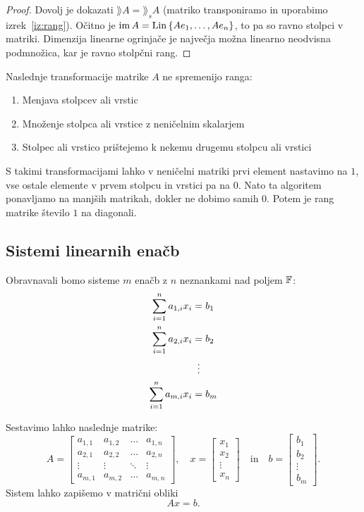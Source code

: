 \documentclass[12pt, a4paper]{article}
\begin{document}
\begin{proof}
Dovolj je dokazati $\rang A=\rang_s A$ (matriko transponiramo in uporabimo izrek~\ref{iz:rang}). Očitno je $\operatorname{im} A=\operatorname{Lin}\left\{Ae_1,\dots,Ae_n\right\}$, to pa so ravno stolpci v matriki. Dimenzija linearne ogrinjače je največja možna linearno neodvisna podmnožica, kar je ravno stolpčni rang.
\end{proof}

Naslednje transformacije matrike $A$ ne spremenijo ranga:

\begin{enumerate}[label=\roman*)]
\item Menjava stolpcev ali vrstic
\item Množenje stolpca ali vrstice z neničelnim skalarjem
\item Stolpec ali vrstico prištejemo k nekemu drugemu stolpcu ali vrstici
\end{enumerate}

S takimi transformacijami lahko v neničelni matriki prvi element nastavimo na $1$, vse ostale elemente v prvem stolpcu in vrstici pa na $0$. Nato ta algoritem ponavljamo na manjših matrikah, dokler ne dobimo samih $0$. Potem je rang matrike število $1$ na diagonali.

\newpage

\subsection{Sistemi linearnih enačb}

Obravnavali bomo sisteme $m$ enačb z $n$ neznankami nad poljem $\mathbb{F}$:
\begin{align*}
\sum_{i=1}^n a_{1,i}x_i&=b_1
\\
\sum_{i=1}^n a_{2,i}x_i&=b_2
\\
&\vdotswithin{=}
\\
\sum_{i=1}^n a_{m,i}x_i&=b_m
\end{align*}

Sestavimo lahko naslednje matrike:
\[
A=\begin{bmatrix}
a_{1,1} & a_{1,2} & \dots & a_{1,n} \\ 
a_{2,1} & a_{2,2} & \dots & a_{2,n} \\ 
\vdots & \vdots & \ddots & \vdots \\ 
a_{m,1} & a_{m,2} & \dots & a_{m,n}
\end{bmatrix},
\quad
x=\begin{bmatrix}
x_1 \\
x_2 \\
\vdots \\
x_n
\end{bmatrix}
\quad\text{in}\quad
b=\begin{bmatrix}
b_1 \\
b_2 \\
\vdots \\
b_m
\end{bmatrix}.
\]
Sistem lahko zapišemo v matrični obliki
\[
Ax=b.
\]
\end{document}
